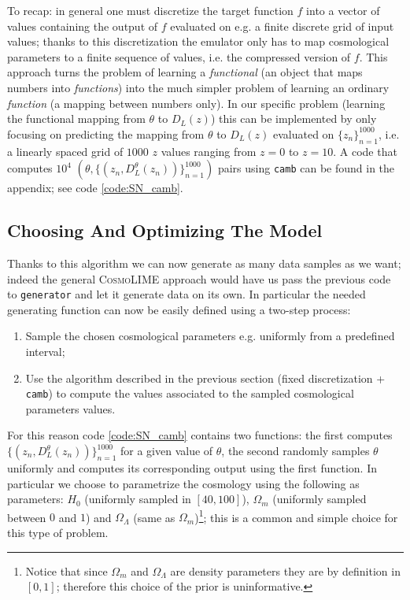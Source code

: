 To recap: in general one must discretize the target function $f$ into a vector of values containing the output of $f$ evaluated on e.g. a finite discrete grid of input values; thanks to this discretization the emulator only has to map cosmological parameters to a finite sequence of values, i.e. the compressed version of $f$. This approach turns the problem of learning a \emph{functional} (an object that maps numbers into \emph{functions}) into the much simpler problem of learning an ordinary \emph{function} (a mapping between numbers only).
In our specific problem (learning the functional mapping from $\theta$ to $D_L(z)$) this can be implemented by only focusing on predicting the mapping from $\theta$ to $D_L(z)$ evaluated on $\{z_n\}_{n=1}^{1000}$, i.e. a linearly spaced grid of $1000$ $z$ values ranging from $z=0$ to $z=10$. A code that computes $10^4$ $(\theta, \{(z_n, D_L^\theta(z_n))\}_{n=1}^{1000})$ pairs using \texttt{camb} can be found in the appendix; see code \ref{code:SN_camb}.

\subsection{Choosing And Optimizing The Model}
Thanks to this algorithm we can now generate as many data samples as we want; indeed the general \textsc{CosmoLIME} approach would have us pass the previous code to \texttt{generator} and let it generate data on its own. In particular the needed generating function can now be easily defined using a two-step process:
\begin{enumerate}
    \item Sample the chosen cosmological parameters e.g. uniformly from a predefined interval;
    \item Use the algorithm described in the previous section (fixed discretization + \texttt{camb}) to compute the values associated to the sampled cosmological parameters values.
\end{enumerate}
For this reason code \ref{code:SN_camb} contains two functions: the first computes $\{(z_n, D_L^\theta(z_n))\}_{n=1}^{1000}$ for a given value of $\theta$, the second randomly samples $\theta$ uniformly and computes its corresponding output using the first function. 
In particular we choose to parametrize the cosmology using the following as parameters: $H_0$ (uniformly sampled in $[40, 100]$), $\Omega_m$ (uniformly sampled between $0$ and $1$) and $\Omega_\Lambda$ (same as $\Omega_m$)\footnote{Notice that since $\Omega_m$ and $\Omega_\Lambda$ are density parameters they are by definition in $[0, 1]$; therefore this choice of the prior is uninformative.}; this is a common and simple choice for this type of problem.

